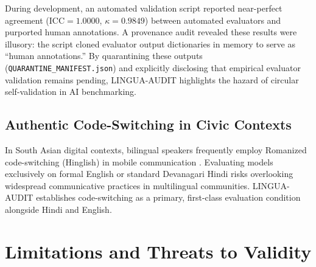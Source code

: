 \documentclass[11pt,a4paper]{article}
\begin{document}
During development, an automated validation script reported near-perfect agreement ($\text{ICC} = 1.0000$, $\kappa = 0.9849$) between automated evaluators and purported human annotations. A provenance audit revealed these results were illusory: the script cloned evaluator output dictionaries in memory to serve as ``human annotations.'' By quarantining these outputs (\texttt{QUARANTINE\_MANIFEST.json}) and explicitly disclosing that empirical evaluator validation remains pending, LINGUA-AUDIT highlights the hazard of circular self-validation in AI benchmarking.

\subsection{Authentic Code-Switching in Civic Contexts}
\label{sec:discussion_codeswitching}

In South Asian digital contexts, bilingual speakers frequently employ Romanized code-switching (Hinglish) in mobile communication \cite{khanuja2020gluecos}. Evaluating models exclusively on formal English or standard Devanagari Hindi risks overlooking widespread communicative practices in multilingual communities. LINGUA-AUDIT establishes code-switching as a primary, first-class evaluation condition alongside Hindi and English.

\section{Limitations and Threats to Validity}
\label{sec:limitations}
\end{document}
